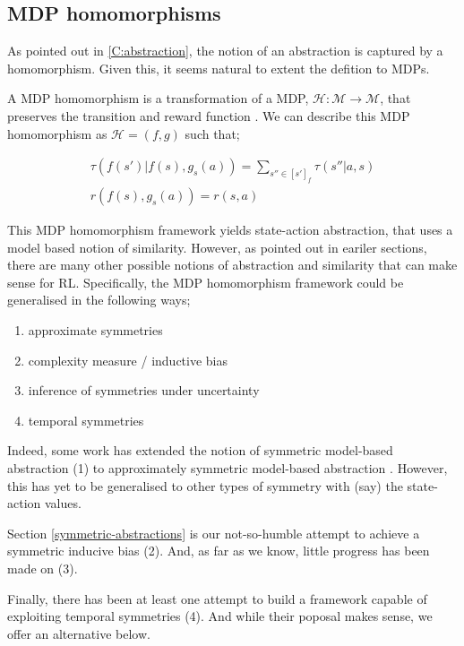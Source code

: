 \subsection{MDP homomorphisms}\label{mdp-homomorphism}

As pointed out in \ref{C:abstraction}, the notion of an abstraction is captured by a homomorphism.
Given this, it seems natural to extent the defition to MDPs.

A MDP homomorphism is a transformation of a MDP, $\mathcal H: \mathcal M\to \mathcal M$, that preserves the transition and reward function \cite{Ravindran2002}. We can describe this MDP homomorphism as $\mathcal H = (f, g)$ such that;

\begin{align}
\tau(f(s')|f(s), g_s(a)) = \sum_{s''\in [s']_f} \tau(s''| a, s) \\
r(f(s), g_s(a)) = r(s, a)
\end{align}

This MDP homomorphism framework yields state-action abstraction, that uses a model based notion of similarity.
However, as pointed out in eariler sections, there are many other possible
notions of abstraction and similarity that can make sense for RL. Specifically, the MDP homomorphism framework
could be generalised in the following ways;

\begin{enumerate}
\tightlist
  \item approximate symmetries
  \item complexity measure / inductive bias
  \item inference of symmetries under uncertainty
  \item temporal symmetries
\end{enumerate}

Indeed, some work has extended the notion of symmetric model-based abstraction (1)
to approximately symmetric model-based abstraction \cite{Ravindran2004}. However, this has yet to be generalised to other types of symmetry with (say) the state-action values.

Section \ref{symmetric-abstractions} is our not-so-humble attempt to achieve a symmetric inducive bias (2). And, as far as we know, little progress has been made on (3).

Finally, there has been at least one attempt \cite{Ravindran2003} to build a framework capable of exploiting temporal symmetries (4). And while their poposal makes sense, we offer an alternative below.

